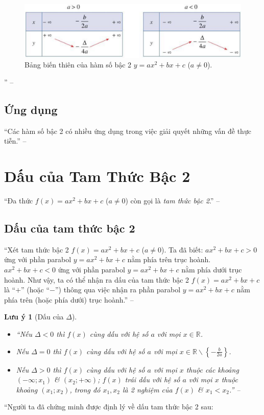 \documentclass[oneside]{book}
\numberwithin{equation}{section}
\newtheorem{luuy}{Lưu ý}[section]
\begin{document}
\begin{figure}[H]
	\centering
	\includegraphics[scale=0.2]{BBT_ham_so_bac_2}
	\caption{Bảng biến thiên của hàm số bậc 2 $y = ax^2 + bx + c$ ($a\ne 0$).}
\end{figure}
'' -- \cite[pp. 40--41]{SGK_Toan_10_Canh_Dieu_tap_1}

\subsection{Ứng dụng}
``Các hàm số bậc 2 có nhiều ứng dụng trong việc giải quyết những vấn đề thực tiễn.'' -- \cite[p. 42]{SGK_Toan_10_Canh_Dieu_tap_1}

\section{Dấu của Tam Thức Bậc 2}
``Đa thức $f(x) = ax^2 + bx + c$ ($a\ne 0$) còn gọi là \textit{tam thức bậc 2}.'' -- \cite[p. 44]{SGK_Toan_10_Canh_Dieu_tap_1}

\subsection{Dấu của tam thức bậc 2}
``Xét tam thức bậc 2 $f(x) = ax^2 + bx + c$ ($a\ne 0$). Ta đã biết: $ax^2 + bx + c > 0$ ứng với phần parabol $y = ax^2 + bx + c$ nằm phía trên trục hoành. $ax^2 + bx + c < 0$ ứng với phần parabol $y = ax^2 + bx + c$ nằm phía dưới trục hoành. Như vậy, ta có thể nhận ra dấu của tam thức bậc 2 $f(x) = ax^2 + bx + c$ là ``$+$'' (hoặc ``$-$'') thông qua việc nhận ra phần parabol $y = ax^2 + bx + c$ nằm phía trên (hoặc phía dưới) trục hoành.'' -- \cite[p. 44]{SGK_Toan_10_Canh_Dieu_tap_1}

\begin{luuy}[Dấu của $\Delta$]
	\begin{itemize}
		\item ``Nếu $\Delta < 0$ thì $f(x)$ cùng dấu với hệ số $a$ với mọi $x\in\mathbb{R}$.
		\item Nếu $\Delta = 0$ thì $f(x)$ cùng dấu với hệ số $a$ với mọi $x\in\mathbb{R}\backslash\left\{-\frac{b}{2a}\right\}$.
		\item Nếu $\Delta > 0$ thì $f(x)$ cùng dấu với hệ số $a$ với mọi $x$ thuộc các khoảng $(-\infty;x_1)$ \& $(x_2;+\infty)$; $f(x)$ trái dấu với hệ số $a$ với mọi $x$ thuộc khoảng $(x_1;x_2)$, trong đó $x_1,x_2$ là 2 nghiệm của $f(x)$ \& $x_1 < x_2$.'' -- \cite[pp. 44--45]{SGK_Toan_10_Canh_Dieu_tap_1}
	\end{itemize}
\end{luuy}
``Người ta đã chứng minh được định lý về dấu tam thức bậc 2 sau:
\end{document}
